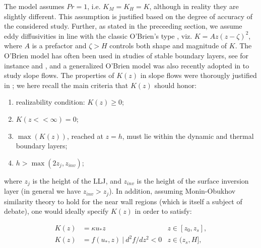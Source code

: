 The model assumes $Pr = 1$, i.e. $K_M = K_H = K$, although in reality they are slightly different. This assumption is justified based on the degree of accuracy of the considered study. 
Further, as stated in the preceeding section, we assume eddy diffusivities in line with the classic O'Brien's type \citep{O'Brien1970}, viz. $K = Az(z-\zeta)^2$, where $A$ is a prefactor and $\zeta > H$ controls both shape and magnitude of $K$.
The O'Brien model has often been used in studies of stable boundary layers, see for instance \citet{pielke1984mesoscale} and \citet{Stull1988}, and a generalized O'Brien model was also recently adopted in \citet{grisogono2001katabatic} to study slope flows.
The properties of $K(z)$ in slope flows were thorougly justified in \citet{Grisogono2002};  we here recall the main criteria that $K(z)$ should honor:
%
\begin{enumerate}
\item realizability condition: $K(z) \ge 0$;
\item $K(z << \infty) = 0$;
\item $\max(K(z))$, reached at $z=h$, must lie within the dynamic and thermal boundary layers;
\item $h > \max(2 z_j, z_{inv})$;
\end{enumerate}
%
where $z_j$ is the height of the LLJ, and $z_{inv}$ is the height of the surface inversion layer (in general we have $z_{inv} > z_j$).
%
In addition, assuming Monin-Obukhov similarity theory to hold for the near wall regions (which is itself a subject of debate), one would ideally specify $K(z)$ in order to satisfy:
%
\begin{linenomath*}
\begin{subequations}
\begin{align}
   K(z) & = \kappa u_* z & z \in [z_0,z_s], \label{MOST1}\\
   K(z) & = f(u_*,z) \ | \ d^2f/dz^2 < 0 & z \in (z_s,H], \label{MOST2}
\end{align}
\end{subequations}
\end{linenomath*}
